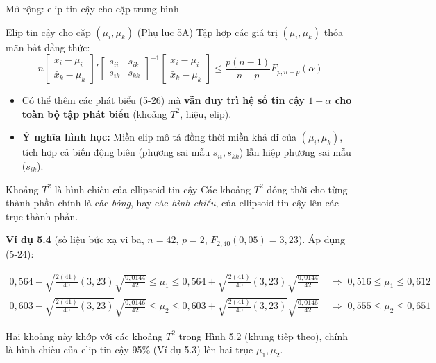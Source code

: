 \begin{frame}{Mở rộng: elip tin cậy cho cặp trung bình}
  \begin{block}{Elip tin cậy cho cặp $(\mu_i, \mu_k)$ (Phụ lục 5A)}
    Tập hợp các giá trị $(\mu_i, \mu_k)$ thỏa mãn bất đẳng thức:
    \begin{equation*}
      n
      \begin{bmatrix}
        \bar{x}_i - \mu_i \\
        \bar{x}_k - \mu_k
      \end{bmatrix}'
      \begin{bmatrix}
        s_{ii} & s_{ik} \\
        s_{ik} & s_{kk}
      \end{bmatrix}^{-1}
      \begin{bmatrix}
        \bar{x}_i - \mu_i \\
        \bar{x}_k - \mu_k
      \end{bmatrix}
      \le \frac{p(n-1)}{n-p} F_{p,n-p}(\alpha) \tag{5-26}
    \end{equation*}
  \end{block}

  \begin{itemize}
    \item Có thể thêm các phát biểu (5-26) mà \textbf{vẫn duy trì hệ số tin cậy $1-\alpha$ cho toàn bộ tập phát biểu} (khoảng $T^2$, hiệu, elip).
    \item \textbf{Ý nghĩa hình học:} Miền elip mô tả đồng thời miền khả dĩ của $(\mu_i, \mu_k)$, tích hợp cả biến động biên (phương sai mẫu $s_{ii}, s_{kk}$) lẫn hiệp phương sai mẫu ($s_{ik}$).
  \end{itemize}
\end{frame}
\begin{frame}{Khoảng $T^2$ là hình chiếu của ellipsoid tin cậy}
Các khoảng $T^2$ đồng thời cho từng thành phần chính là các \emph{bóng}, hay
các \emph{hình chiếu}, của ellipsoid tin cậy lên các trục thành phần.

\vspace{0.5em}
\textbf{Ví dụ 5.4} (số liệu bức xạ vi ba, $n=42$, $p=2$, $F_{2,40}(0{,}05)=3{,}23$).
Áp dụng (5-24):

{\small
\begin{align*}
0{,}564 - \sqrt{\tfrac{2(41)}{40}(3{,}23)}\sqrt{\tfrac{0{,}0144}{42}} \le \mu_1 \le 0{,}564 + \sqrt{\tfrac{2(41)}{40}(3{,}23)}\sqrt{\tfrac{0{,}0144}{42}}
&\;\Rightarrow\; 0{,}516\le \mu_1\le 0{,}612\\[1ex]
0{,}603 - \sqrt{\tfrac{2(41)}{40}(3{,}23)}\sqrt{\tfrac{0{,}0146}{42}} \le \mu_2 \le 0{,}603 + \sqrt{\tfrac{2(41)}{40}(3{,}23)}\sqrt{\tfrac{0{,}0146}{42}}
&\;\Rightarrow\; 0{,}555\le \mu_2\le 0{,}651
\end{align*}}

\vspace{0.3em}
Hai khoảng này khớp với các khoảng $T^2$ trong Hình 5.2 (khung tiếp theo),
chính là hình chiếu của elip tin cậy 95\% (Ví dụ 5.3) lên hai trục $\mu_1,\mu_2$.
\end{frame}

